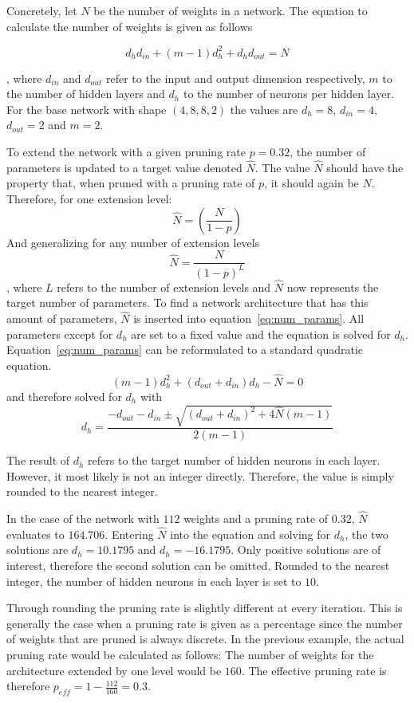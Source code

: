 Concretely, let $N$ be the number of weights in a network.
The equation to calculate the number of weights is given as follows

\begin{equation} \label{eq:num_params}
    d_h d_{in}+(m-1)d_h^2 + d_h d_{out} = N
\end{equation}

, where $d_{in}$ and $d_{out}$ refer to the input and output dimension respectively, $m$ to the number of hidden layers and
$d_h$ to the number of neurons per hidden layer.
For the base network with shape $(4, 8, 8, 2)$ the values are $d_h=8$, 
$d_{in}=4$, $d_{out}=2$ and $m=2$.
 
To extend the network with a given pruning rate $p=0.32$, the number of parameters is updated to a target value denoted $\hat N$.
The value $\hat N$ should have the property that, when pruned with a pruning rate of $p$, it should again be $N$.
Therefore, for one extension level:
\[ \hat N = {(\frac{N}{1-p})} \]
And generalizing for any number of extension levels
\[ \hat N = {\frac{N}{{(1-p)}^L}} \]
, where $L$ refers to the number of extension levels and $\hat N$ now represents the target number of parameters. 
To find a network architecture that has this amount of parameters, $\hat N$ is inserted into equation~\ref{eq:num_params}.
All parameters except for $d_h$ are set to a fixed value and the equation is solved for $d_h$.
Equation~\ref{eq:num_params} can be reformulated to a standard quadratic equation.
\[ (m-1)d_h^2 + (d_{out} + d_{in}) d_h - \hat N = 0 \]
and therefore solved for $d_h$ with 
\[
    d_h = \frac{
        -d_{out} - d_{in} \pm \sqrt{{(d_{out} + d_{in})}^2 + 4 \hat N(m-1)} 
    }{
        2(m-1)
    }
\]

The result of $d_h$ refers to the target number of hidden neurons in each layer.
However, it most likely is not an integer directly.
Therefore, the value is simply rounded to the nearest integer.

In the case of the network with $112$ weights and a pruning rate of $0.32$, $\hat N$ evaluates to $164.706$.
Entering $\hat N$ into the equation and solving for $d_h$, the two solutions are $d_h=10.1795$ and $d_h=-16.1795$.
Only positive solutions are of interest, therefore the second solution can be omitted.
Rounded to the nearest integer, the number of hidden neurons in each layer is set to $10$.

Through rounding the pruning rate is slightly different at every iteration.
This is generally the case when a pruning rate is given as a percentage since the number of weights that are pruned is always discrete.
In the previous example, the actual pruning rate would be calculated as follows:
The number of weights for the architecture extended by one level would be $160$.
The effective pruning rate is therefore $p_{eff}=1-\frac{112}{160}=0.3$.

